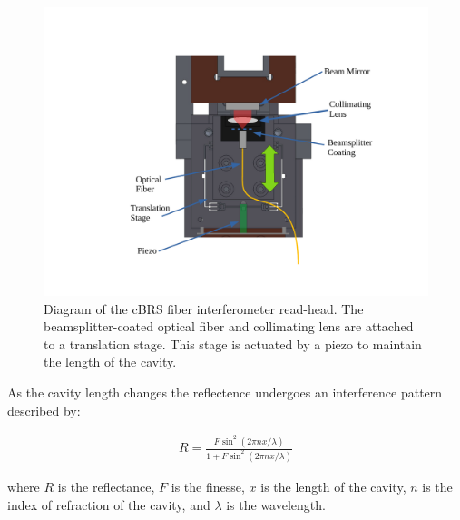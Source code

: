 \documentclass [12pt, proquest]{uwthesis}[2019]
\begin{document}
\begin{figure}[!h]
\begin{center}
\includegraphics[width=\textwidth]{cBRSOptics.pdf}
\end{center}
\caption[Diagram of the cBRS fiber interferometer read-head]{Diagram of the cBRS fiber interferometer read-head. The beamsplitter-coated optical fiber and collimating lens are attached to a translation stage. This stage is actuated by a piezo to maintain the length of the cavity.}
\label{cBRSOpt}
\end{figure}

As the cavity length changes the reflectence undergoes an interference pattern described by:

\begin{align}
R=\frac{F \sin^2(2\pi n x/\lambda)}{1+F \sin^2(2\pi n x/\lambda)}
\end{align}

where $R$ is the reflectance, $F$ is the finesse, $x$ is the length of the cavity, $n$ is the index of refraction of the cavity, and $\lambda$ is the wavelength.
\end{document}
